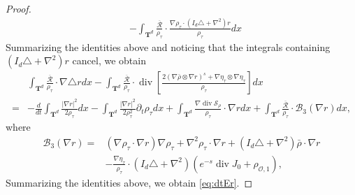 \documentclass[10pt,a4paper]{amsart}
\def\T{{\mathbf T}}%
\def\d{{\partial}}
\DeclareMathOperator{\diver}{div}
\begin{document}
\begin{proof}
\begin{align*}
&-\int_{\T^d} \frac{\overline{\mathcal{R}}}{\rho_\tau}\cdot\frac{\nabla\rho_\tau\cdot(I_d\triangle+\nabla^2)r}{\rho_\tau}dx
\end{align*}
Summarizing the identities above and noticing that the integrals containing $(I_d\triangle+\nabla^2)r$ cancel, we obtain
\begin{align*}
&\int_{\T^d} \frac{\overline{\mathcal{R}}}{\rho_\tau}\cdot\nabla\triangle rdx-\int_{\T^d} \frac{\overline{\mathcal{R}}}{\rho_\tau}\cdot\diver\left[\frac{2(\nabla\bar\rho\otimes \nabla r)^s+\nabla \eta_\tau\otimes \nabla \eta_\tau}{\rho_\tau}\right]dx\\
=&-\frac{d}{dt}\int_{\T^d}\frac{|\nabla r|^2}{2\rho_\tau}dx-\int_{\T^d}\frac{|\nabla r|^2}{2\rho_\tau^2}\d_t\rho_\tau dx+\int_{\T^d} \frac{\nabla\diver \mathcal{S}_\rho}{\rho_\tau}\cdot\nabla rdx+\int_{\T^d}\frac{\overline{\mathcal{R}}}{\rho_\tau}\cdot\mathcal{B}_3(\nabla r)dx,
\end{align*}
where
\begin{equation}\label{eq:B3}
\begin{aligned}
\mathcal{B}_3(\nabla r)=&(\nabla\rho_\tau\cdot\nabla r)\nabla \rho_\tau+\nabla^2\rho_\tau\cdot\nabla r+(I_d\triangle+\nabla^2)\bar\rho\cdot\nabla r\\
&-\frac{\nabla \eta_\tau}{\rho_\tau}\cdot(I_d\triangle+\nabla^2)(e^{-s}\diver J_0+\rho_{\mathcal{O},1}),
\end{aligned}
\end{equation}
Summarizing the identities above, we obtain \eqref{eq:dtEr}.
\end{proof}
\end{document}
